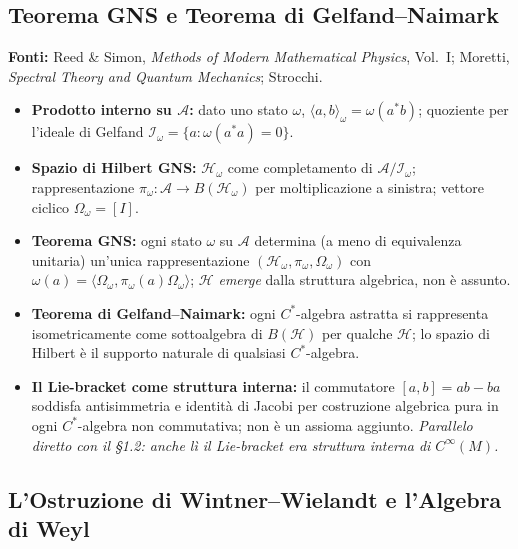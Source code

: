 \documentclass[12pt, a4paper]{article}
\newcommand{\fonti}[1]{%
	\begin{fontebox}
		\textcolor{fontecolor}{\footnotesize\textbf{Fonti:} #1}
	\end{fontebox}%
}
\begin{document}
	\subsection{Teorema GNS e Teorema di Gelfand--Naimark}
	
	\fonti{Reed \& Simon, \textit{Methods of Modern Mathematical Physics}, Vol.~I;
		Moretti, \textit{Spectral Theory and Quantum Mechanics}; Strocchi.}
	
	\begin{itemize}
		\item \textbf{Prodotto interno su $\mathcal{A}$:} dato uno stato $\omega$,
		$\langle a, b\rangle_\omega = \omega(a^*b)$; quoziente per l'ideale di Gelfand
		$\mathcal{I}_\omega = \{a : \omega(a^*a) = 0\}$.
		\item \textbf{Spazio di Hilbert GNS:} $\mathcal{H}_\omega$ come completamento di
		$\mathcal{A}/\mathcal{I}_\omega$; rappresentazione $\pi_\omega: \mathcal{A} \to
		B(\mathcal{H}_\omega)$ per moltiplicazione a sinistra; vettore ciclico $\Omega_\omega
		= [I]$.
		\item \textbf{Teorema GNS:} ogni stato $\omega$ su $\mathcal{A}$ determina (a meno
		di equivalenza unitaria) un'unica rappresentazione $(\mathcal{H}_\omega, \pi_\omega,
		\Omega_\omega)$ con $\omega(a) = \langle\Omega_\omega, \pi_\omega(a)\Omega_\omega\rangle$;
		$\mathcal{H}$ \emph{emerge} dalla struttura algebrica, non è assunto.
		\item \textbf{Teorema di Gelfand--Naimark:} ogni $C^*$-algebra astratta si
		rappresenta isometricamente come sottoalgebra di $B(\mathcal{H})$ per qualche
		$\mathcal{H}$; lo spazio di Hilbert è il supporto naturale di qualsiasi
		$C^*$-algebra.
		\item \textbf{Il Lie-bracket come struttura interna:} il commutatore $[a,b] = ab-ba$
		soddisfa antisimmetria e identità di Jacobi per costruzione algebrica pura in ogni
		$C^*$-algebra non commutativa; non è un assioma aggiunto. \emph{Parallelo diretto
			con il §1.2: anche lì il Lie-bracket era struttura interna di $C^\infty(M)$.}
	\end{itemize}
	
	\subsection{L'Ostruzione di Wintner--Wielandt e l'Algebra di Weyl}
	
\end{document}
